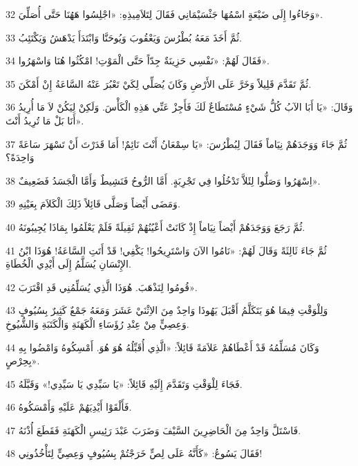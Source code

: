 \par 32 وَجَاءُوا إِلَى ضَيْعَةٍ اسْمُهَا جَثْسَيْمَانِي فَقَالَ لِتَلاَمِيذِهِ: «اجْلِسُوا هَهُنَا حَتَّى أُصَلِّيَ».
\par 33 ثُمَّ أَخَذَ مَعَهُ بُطْرُسَ وَيَعْقُوبَ وَيُوحَنَّا وَابْتَدَأَ يَدْهَشُ وَيَكْتَئِبُ.
\par 34 فَقَالَ لَهُمْ: «نَفْسِي حَزِينَةٌ جِدّاً حَتَّى الْمَوْتِ! امْكُثُوا هُنَا وَاسْهَرُوا».
\par 35 ثُمَّ تَقَدَّمَ قَلِيلاً وَخَرَّ عَلَى الأَرْضِ وَكَانَ يُصَلِّي لِكَيْ تَعْبُرَ عَنْهُ السَّاعَةُ إِنْ أَمْكَنَ.
\par 36 وَقَالَ: «يَا أَبَا الآبُ كُلُّ شَيْءٍ مُسْتَطَاعٌ لَكَ فَأَجِزْ عَنِّي هَذِهِ الْكَأْسَ. وَلَكِنْ لِيَكُنْ لاَ مَا أُرِيدُ أَنَا بَلْ مَا تُرِيدُ أَنْتَ».
\par 37 ثُمَّ جَاءَ وَوَجَدَهُمْ نِيَاماً فَقَالَ لِبُطْرُسَ: «يَا سِمْعَانُ أَنْتَ نَائِمٌ! أَمَا قَدَرْتَ أَنْ تَسْهَرَ سَاعَةً وَاحِدَةً؟
\par 38 اِسْهَرُوا وَصَلُّوا لِئَلاَّ تَدْخُلُوا فِي تَجْرِبَةٍ. أَمَّا الرُّوحُ فَنَشِيطٌ وَأَمَّا الْجَسَدُ فَضَعِيفٌ».
\par 39 وَمَضَى أَيْضاً وَصَلَّى قَائِلاً ذَلِكَ الْكَلاَمَ بِعَيْنِهِ.
\par 40 ثُمَّ رَجَعَ وَوَجَدَهُمْ أَيْضاً نِيَاماً إِذْ كَانَتْ أَعْيُنُهُمْ ثَقِيلَةً فَلَمْ يَعْلَمُوا بِمَاذَا يُجِيبُونَهُ.
\par 41 ثُمَّ جَاءَ ثَالِثَةً وَقَالَ لَهُمْ: «نَامُوا الآنَ وَاسْتَرِيحُوا! يَكْفِي! قَدْ أَتَتِ السَّاعَةُ! هُوَذَا ابْنُ الإِنْسَانِ يُسَلَّمُ إِلَى أَيْدِي الْخُطَاةِ.
\par 42 قُومُوا لِنَذْهَبَ. هُوَذَا الَّذِي يُسَلِّمُنِي قَدِ اقْتَرَبَ».
\par 43 وَلِلْوَقْتِ فِيمَا هُوَ يَتَكَلَّمُ أَقْبَلَ يَهُوذَا وَاحِدٌ مِنَ الاِثْنَيْ عَشَرَ وَمَعَهُ جَمْعٌ كَثِيرٌ بِسُيُوفٍ وَعِصِيٍّ مِنْ عِنْدِ رُؤَسَاءِ الْكَهَنَةِ وَالْكَتَبَةِ وَالشُّيُوخِ.
\par 44 وَكَانَ مُسَلِّمُهُ قَدْ أَعْطَاهُمْ عَلاَمَةً قَائِلاً: «الَّذِي أُقَبِّلُهُ هُوَ هُوَ. أَمْسِكُوهُ وَامْضُوا بِهِ بِحِرْصٍ».
\par 45 فَجَاءَ لِلْوَقْتِ وَتَقَدَّمَ إِلَيْهِ قَائِلاً: «يَا سَيِّدِي يَا سَيِّدِي!» وَقَبَّلَهُ.
\par 46 فَأَلْقَوْا أَيْدِيَهُمْ عَلَيْهِ وَأَمْسَكُوهُ.
\par 47 فَاسْتَلَّ وَاحِدٌ مِنَ الْحَاضِرِينَ السَّيْفَ وَضَرَبَ عَبْدَ رَئِيسِ الْكَهَنَةِ فَقَطَعَ أُذْنَهُ.
\par 48 فَقَالَ يَسُوعُ: «كَأَنَّهُ عَلَى لِصٍّ خَرَجْتُمْ بِسُيُوفٍ وَعِصِيٍّ لِتَأْخُذُونِي!
